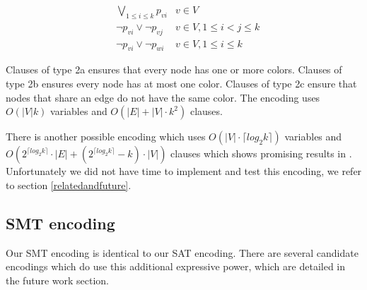 \documentclass{sig-alternate}
\begin{document}
\setcounter{equation}{1}
\begin{subequations}
\begin{align}
        & \bigvee_{1 \leq i \leq k} p_{vi}& v \in V\\
        & \neg p_{vi} \lor \neg p_{vj} & v \in V, 1 \leq i < j \leq k \\
        & \neg p_{vi} \lor \neg p_{wi} & v \in V, 1 \leq i \leq k
\end{align}
\end{subequations}

Clauses of type 2a ensures that every node has one or more colors. Clauses of type 2b ensures every node has at most one color. Clauses of type 2c ensure that nodes that share an edge do not have the same color.
The encoding uses $O(|V| k)$ variables and $O(|E|+|V| \cdot k^2)$ clauses.

There is another possible encoding which uses $O(|V| \cdot \lceil{log_2{k}\rceil})$ variables and $O(2^{\lceil{log_2k}\rceil} \cdot |E|+(2^{\lceil{log_2k\rceil}}-k) \cdot |V|)$ clauses which shows promising results in \cite{wille2008using}.
Unfortunately we did not have time to implement and test this encoding, we refer to section \ref{relatedandfuture}.

\subsection{SMT encoding}
Our SMT encoding is identical to our SAT encoding.
There are several candidate encodings which do use this additional expressive power, which are detailed in the future work section.
\end{document}
